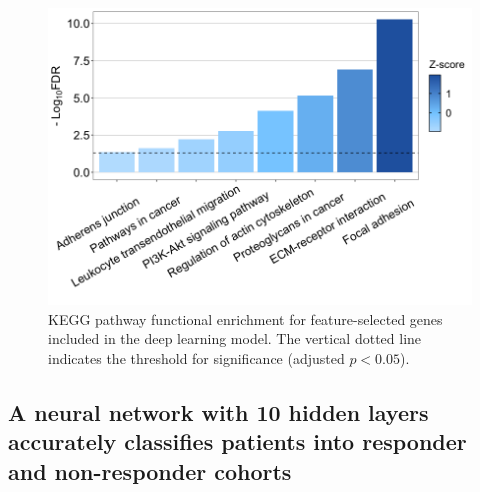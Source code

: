 \documentclass[10pt, letterpaper, twocolumn]{article}
\begin{document}
\begin{figure}[t]
	\centering
	\includegraphics[width=\columnwidth]{Figures/kegg.png}
	\caption{KEGG pathway functional enrichment for feature-selected genes included in the deep learning model. The vertical dotted line indicates the threshold for significance (adjusted $p < 0.05$).}
	\label{fig:kegg}
\end{figure}


\subsection{A neural network with 10 hidden layers accurately classifies patients into responder and non-responder cohorts}
\end{document}
